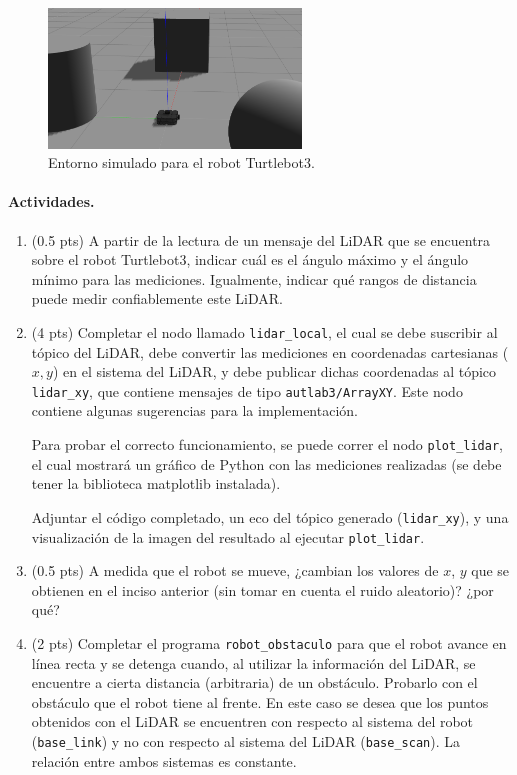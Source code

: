 \documentclass[a4paper,11pt]{robotlabs}
\begin{document}
\begin{figure}%
  \centering \footnotesize
  \includegraphics[width=0.6\textwidth]{images/lab3/world1}
  \captionsetup{font=footnotesize}
  \caption{Entorno simulado para el robot Turtlebot3.}
  \label{fig:world1}
\end{figure}


\paragraph{Actividades.}

\begin{enumerate}
\item (0.5 pts) A partir de la lectura de un mensaje del LiDAR que se encuentra
  sobre el robot Turtlebot3, indicar cuál es el ángulo máximo y el ángulo
  mínimo para las mediciones. Igualmente, indicar qué rangos de distancia puede
  medir confiablemente este LiDAR.

\item (4 pts) Completar el nodo llamado \texttt{lidar\_local}, el cual se debe
  suscribir al tópico del LiDAR, debe convertir las mediciones en coordenadas
  cartesianas ($x,y$) en el sistema del LiDAR, y debe publicar dichas
  coordenadas al tópico \texttt{lidar\_xy}, que contiene mensajes de tipo
  \texttt{autlab3/ArrayXY}. Este nodo contiene algunas sugerencias para la
  implementación.

  Para probar el correcto funcionamiento, se puede correr el nodo
  \texttt{plot\_lidar}, el cual mostrará un gráfico de Python con las
  mediciones realizadas (se debe tener la biblioteca matplotlib instalada).

  Adjuntar el código completado, un eco del tópico generado
  (\texttt{lidar\_xy}), y una visualización de la imagen del resultado al
  ejecutar \texttt{plot\_lidar}.

\item (0.5 pts) A medida que el robot se mueve, ¿cambian los valores de $x$,
  $y$ que se obtienen en el inciso anterior (sin tomar en cuenta el ruido
  aleatorio)? ¿por qué?

\item (2 pts) Completar el programa \texttt{robot\_obstaculo} para que el robot
  avance en línea recta y se detenga cuando, al utilizar la información del
  LiDAR, se encuentre a cierta distancia (arbitraria) de un obstáculo. Probarlo
  con el obstáculo que el robot tiene al frente. En este caso se desea que los
  puntos obtenidos con el LiDAR se encuentren con respecto al sistema del robot
  (\texttt{base\_link}) y no con respecto al sistema del LiDAR
  (\texttt{base\_scan}). La relación entre ambos sistemas es constante.

\end{enumerate}
\end{document}
